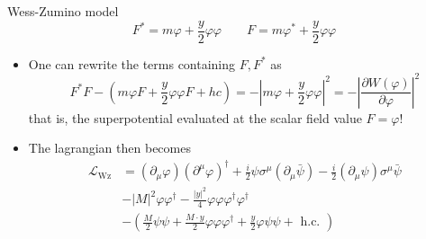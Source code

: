 \documentclass[10pt]{beamer}
\begin{document}
\begin{frame}{Wess-Zumino model}
    \begin{equation*}
        F^{*} = m\varphi + \frac{y}{2}\varphi\varphi \qquad F = m \varphi^{*} + \frac{y}{2} \varphi \varphi
    \end{equation*}
    \begin{itemize}
        \item One can rewrite the terms containing $F, F^{*}$ as  
        \begin{equation*}
            F^{*} F-\left(m \varphi F+\frac{y}{2} \varphi \varphi F+h c\right)=-\left|m \varphi+\frac{y}{2} \varphi \varphi\right|^{2}=-\left|\frac{\partial W(\varphi)}{\partial \varphi}\right|^{2}
        \end{equation*}
        that is, the superpotential evaluated at the scalar field value $F = \varphi$!
        \item The lagrangian then becomes
        \begin{equation*}
            \begin{aligned}
                \mathcal{L}_{\mathrm{Wz}} &=\left(\partial_{\mu} \varphi\right)\left(\partial^{\mu} \varphi\right)^{\dagger}+\frac{i}{2} \psi \sigma^{\mu}\left(\partial_{\mu} \bar{\psi}\right)-\frac{i}{2}\left(\partial_{\mu} \psi\right) \sigma^{\mu} \bar{\psi} \\
                &-|M|^{2} \varphi \varphi^{\dagger}-\frac{|y|^{2}}{4} \varphi \varphi \varphi^{\dagger} \varphi^{\dagger} \\
                &- \left(\frac{M}{2} \psi \psi+\frac{M \cdot y}{2} \varphi \varphi \varphi^{\dagger}+\frac{y}{2} \varphi \psi \psi+\text { h.c. }\right)
                \end{aligned}
        \end{equation*}
        
        \end{itemize}
\end{frame}
\end{document}
